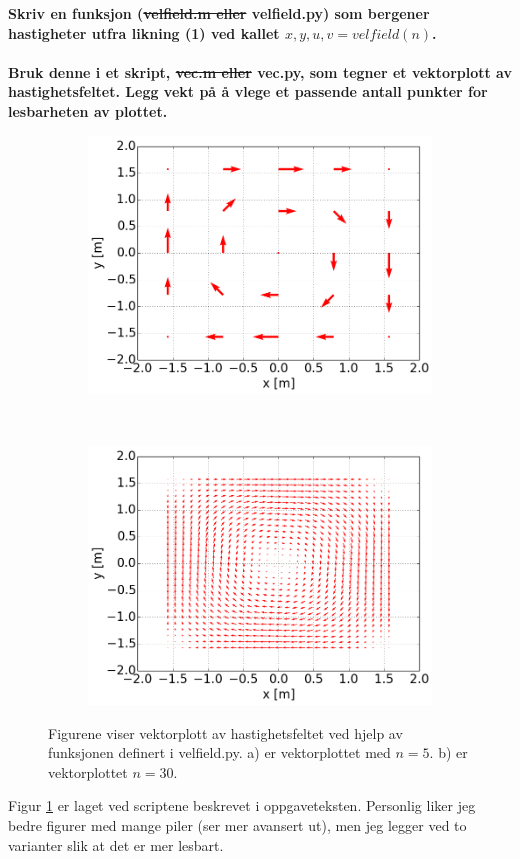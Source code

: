 \textbf{Skriv en funksjon (\sout{velfield.m eller} velfield.py) som
bergener hastigheter utfra likning (1) ved kallet $x,y,u,v = velfield(n)$.
\\
\\
Bruk denne i et skript, \sout{vec.m eller} vec.py, som tegner et vektorplott
av hastighetsfeltet. Legg vekt på å vlege et passende antall punkter for
lesbarheten av plottet.}

\begin{figure}[H]
    \centering
    \begin{subfigure}{0.5\textwidth}
        \centering
        \includegraphics[width=\linewidth]{../4b5.png}
        \caption{}
    \end{subfigure}%
    ~
    \begin{subfigure}{0.5\textwidth}
        \centering
        \includegraphics[width=\linewidth]{../4b30.png}
        \caption{}
    \end{subfigure}
    \caption{Figurene viser vektorplott av hastighetsfeltet
    ved hjelp av funksjonen definert i velfield.py. a) er vektorplottet med $n = 5$.
    b) er vektorplottet $n = 30$. }
    \label{fig_4b}
\end{figure}

Figur \ref{fig_4b} er laget ved scriptene beskrevet i oppgaveteksten.
Personlig liker jeg bedre figurer med mange piler (ser mer avansert ut), men
jeg legger ved to varianter slik at det er mer lesbart. 
